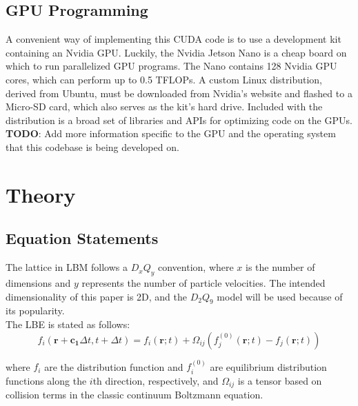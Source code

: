 \documentclass[twoside]{article}
\begin{document}
\subsection*{GPU Programming}

\noindent A convenient way of implementing this CUDA code is to use a development kit containing an Nvidia GPU. Luckily, the Nvidia Jetson Nano\cite{JetsonNano} is a cheap board on which to run parallelized GPU programs. The Nano contains 128 Nvidia GPU cores, which can perform up to 0.5 TFLOPs. A custom Linux distribution, derived from Ubuntu, must be downloaded from Nvidia's website and flashed to a Micro-SD card, which also serves as the kit's hard drive. Included with the distribution is a broad set of libraries and APIs for optimizing code on the GPUs.\\

\noindent \textbf{TODO}: Add more information specific to the GPU and the operating system that this codebase is being developed on.\\




\section{Theory}
\subsection*{Equation Statements}

\noindent The lattice in LBM follows a $D_xQ_y$ convention, where $x$ is the number of dimensions and $y$ represents the number of particle velocities. The intended dimensionality of this paper is 2D, and the \(D_2Q_9\) model will be used because of its popularity.\\

\noindent The LBE is stated as follows\cite{WolfGladrow:2005}:
%
\begin{equation}
f_i(\mathbf{r} + \mathbf{c_1}\Delta t, t + \Delta t) = f_i(\mathbf{r};t) + \Omega_{ij}\left(f_j^{(0)}(\textbf{r};t) - f_j(\mathbf{r};t)\right)
\end{equation}
%

\noindent where $f_i$ are the distribution function and $f_i^{(0)}$ are equilibrium distribution functions along the $i$th direction, respectively, and $\Omega_{ij}$ is a tensor based on collision terms in the classic continuum Boltzmann equation.\\
\end{document}
